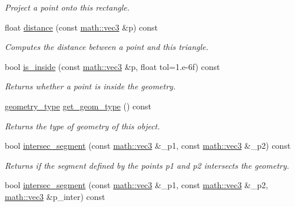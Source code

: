 \begin{DoxyCompactItemize}
\begin{DoxyCompactList}\small\item\em Project a point onto this rectangle. \end{DoxyCompactList}\item 
float \hyperlink{classphysim_1_1geometry_1_1rectangle_aedd73dc941859c329b59e8f76d7366a2}{distance} (const \hyperlink{structphysim_1_1math_1_1vec3}{math\+::vec3} \&p) const
\begin{DoxyCompactList}\small\item\em Computes the distance between a point and this triangle. \end{DoxyCompactList}\item 
bool \hyperlink{classphysim_1_1geometry_1_1rectangle_ab3e8fe39d7d8fa8139bae3f84b41127c}{is\+\_\+inside} (const \hyperlink{structphysim_1_1math_1_1vec3}{math\+::vec3} \&p, float tol=1.e-\/6f) const
\begin{DoxyCompactList}\small\item\em Returns whether a point is inside the geometry. \end{DoxyCompactList}\item 
\mbox{\label{classphysim_1_1geometry_1_1rectangle_aedc726f68c234df3e36732606df7ca9b}} 
\hyperlink{namespacephysim_1_1geometry_a60e1ee7ea6f443f8ec9341ca7f12f1b7}{geometry\+\_\+type} \hyperlink{classphysim_1_1geometry_1_1rectangle_aedc726f68c234df3e36732606df7ca9b}{get\+\_\+geom\+\_\+type} () const
\begin{DoxyCompactList}\small\item\em Returns the type of geometry of this object. \end{DoxyCompactList}\item 
bool \hyperlink{classphysim_1_1geometry_1_1rectangle_a293501e32bf61654f43c8e95d0079df5}{intersec\+\_\+segment} (const \hyperlink{structphysim_1_1math_1_1vec3}{math\+::vec3} \&\+\_\+p1, const \hyperlink{structphysim_1_1math_1_1vec3}{math\+::vec3} \&\+\_\+p2) const
\begin{DoxyCompactList}\small\item\em Returns if the segment defined by the points {\itshape p1} and {\itshape p2} intersects the geometry. \end{DoxyCompactList}\item 
bool \hyperlink{classphysim_1_1geometry_1_1rectangle_a188c18dc60d2bca9bd9d6a0676ef7862}{intersec\+\_\+segment} (const \hyperlink{structphysim_1_1math_1_1vec3}{math\+::vec3} \&\+\_\+p1, const \hyperlink{structphysim_1_1math_1_1vec3}{math\+::vec3} \&\+\_\+p2, \hyperlink{structphysim_1_1math_1_1vec3}{math\+::vec3} \&p\+\_\+inter) const

\end{DoxyCompactItemize}
